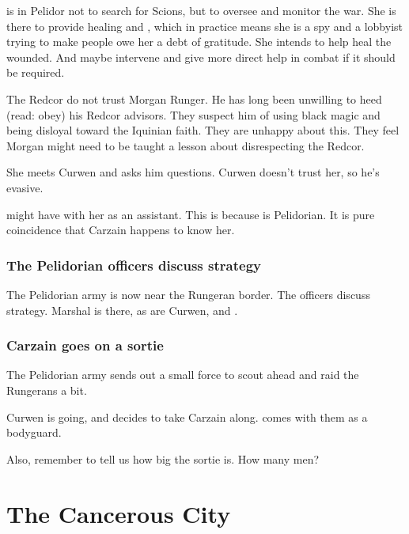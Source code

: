 \Esmerel{} is in Pelidor not to search for Scions, but to oversee and monitor the war. 
She is there to provide healing and , which in practice means she is a spy and a lobbyist trying to make people owe her a debt of gratitude. 
She intends to help heal the wounded. 
And maybe intervene and give more direct help in combat if it should be required. 

The Redcor do not trust Morgan Runger. 
He has long been unwilling to heed (read: obey) his Redcor advisors. 
They suspect him of using black magic and being disloyal toward the Iquinian faith. 
They are unhappy about this. 
They feel Morgan might need to be taught a lesson about disrespecting the Redcor. 

She meets Curwen and asks him questions. 
Curwen doesn't trust her, so he's evasive. 

\Esmerel{} might have \Racel{} with her as an assistant. 
This is because \Racel{} is Pelidorian.
It is pure coincidence that Carzain happens to know her. 





\subsubsection{The Pelidorian officers discuss strategy}
The Pelidorian army is now near the Rungeran border. 
The officers discuss strategy. 
Marshal  is there, as are Curwen, \Sanyor{} and \Dornaer. 





\subsubsection{Carzain goes on a sortie}
The Pelidorian army sends out a small force to scout ahead and raid the Rungerans a bit. 

Curwen is going, and decides to take Carzain along. 
 comes with them as a bodyguard. 

Also, remember to tell us how big the sortie is. How many men?







\section{The Cancerous City}







